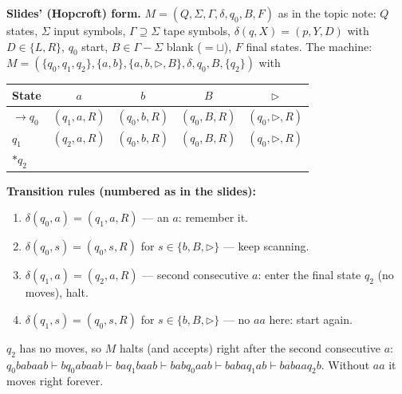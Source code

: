 \documentclass[11pt,a4paper]{article}
\begin{document}
\begin{solution}
\textbf{Slides' (Hopcroft) form.} $M=(Q,\Sigma,\Gamma,\delta,q_0,B,F)$ as in the topic note: $Q$ states, $\Sigma$ input symbols, $\Gamma\supseteq\Sigma$ tape symbols, $\delta(q,X)=(p,Y,D)$ with $D\in\{L,R\}$, $q_0$ start, $B\in\Gamma-\Sigma$ blank ($=\sqcup$), $F$ final states. The machine:
$M=(\{q_0,q_1,q_2\},\{a,b\},\{a,b,\triangleright,B\},\delta,q_0,B,\{q_2\})$ with
\begin{center}\small\begin{tabular}{l|cccc}\toprule State & $a$ & $b$ & $B$ & $\triangleright$\\\midrule
$\to q_0$ & $(q_1,a,R)$ & $(q_0,b,R)$ & $(q_0,B,R)$ & $(q_0,\triangleright,R)$\\
$q_1$ & $(q_2,a,R)$ & $(q_0,b,R)$ & $(q_0,B,R)$ & $(q_0,\triangleright,R)$\\
$*q_2$ & & & & \\\bottomrule\end{tabular}\end{center}
\par\noindent\textbf{Transition rules (numbered as in the slides):}
{\small\begin{enumerate}[label=\arabic*.,itemsep=0pt]
\item $\delta(q_0,a)=(q_1,a,R)$ --- an $a$: remember it.
\item $\delta(q_0,s)=(q_0,s,R)$ for $s\in\{b,B,\triangleright\}$ --- keep scanning.
\item $\delta(q_1,a)=(q_2,a,R)$ --- second consecutive $a$: enter the final state $q_2$ (no moves), halt.
\item $\delta(q_1,s)=(q_0,s,R)$ for $s\in\{b,B,\triangleright\}$ --- no $aa$ here: start again.
\end{enumerate}}
$q_2$ has no moves, so $M$ halts (and accepts) right after the second consecutive $a$: $q_0babaab\vdash bq_0abaab\vdash baq_1baab\vdash babq_0aab\vdash babaq_1ab\vdash babaaq_2b$. Without $aa$ it moves right forever.
\end{solution}
\end{document}

